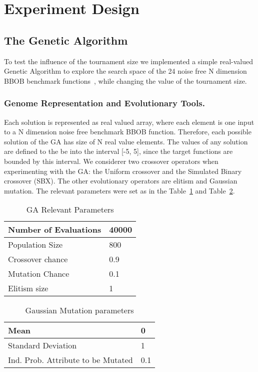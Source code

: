 \section{Experiment Design}

\subsection{The Genetic Algorithm}\label{sec:proposed:ga}

To test the influence of the tournament size we implemented a simple real-valued Genetic Algorithm to explore the search space of the 24 noise free N dimension BBOB benchmark functions~\cite{hansen2010real}, while changing the value of the tournament size.

\subsubsection*{Genome Representation and Evolutionary Tools.}
Each solution is represented as real valued array, where each element is one input to a N dimension noise free benchmark BBOB function. Therefore, each possible solution of the GA has size of N real value elements. The values of any solution are defined to the be into the interval [-5, 5], since the target functions are bounded by this interval. We considerer two crossover operators when experimenting with the GA: the Uniform crossover and the Simulated Binary crossover (SBX). The other evolutionary operators are elitism and Gaussian mutation. The relevant parameters were set as in the Table~\ref{relevant_par} and Table~\ref{gaussian_par}.

\vspace{3mm}
\begin{table}[!ht]
	\centering
	\begin{tabular}{|l|l|}
	\hline
	Number of Evaluations & 40000 \\ \hline
	Population Size &  800		\\ \hline
	Crossover chance 	& 0.9	\\ \hline
	Mutation Chance 	& 0.1	\\ \hline		
	Elitism size 		& 1		\\ \hline		
	\end{tabular}
	\caption{GA Relevant Parameters}
	\label{relevant_par}
\end{table}
	\vspace{-2mm}
%
\begin{table}[!ht]
	\centering
	\begin{tabular}{|l|l|}
	\hline
		Mean & 0 \\ \hline		
		Standard Deviation & 1 \\ \hline		
		Ind. Prob. Attribute to be Mutated &  0.1 \\ \hline		
	\end{tabular}
	\caption{Gaussian Mutation parameters}
	\label{gaussian_par}
\end{table}

